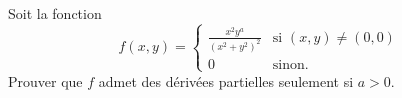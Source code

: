 
\begin{exercice}\label{exoMaximisation-0001}

	Soit la fonction 
	\begin{equation}
		f(x,y)=\begin{cases}
			\frac{ x^2y^a }{ (x^2+y^2)^2 }	&	\text{si $(x,y)\neq(0,0)$}\\
			0	&	 \text{sinon}.
		\end{cases}
	\end{equation}
	Prouver que $f$ admet des dérivées partielles seulement si $a>0$.

\end{exercice}
